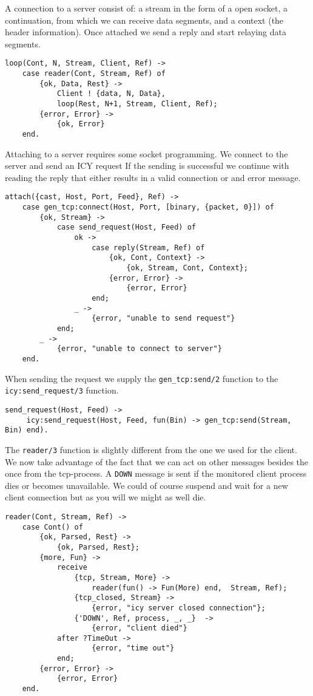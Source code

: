 \documentclass[a4paper,11pt]{article}
\begin{document}
A connection to a server consist of: a stream in the form of a open
socket, a continuation, from which we can receive data segments, and a
context (the header information). Once attached we send a reply and
start relaying data segments.

\begin{verbatim}
loop(Cont, N, Stream, Client, Ref) ->
    case reader(Cont, Stream, Ref) of
        {ok, Data, Rest} ->
            Client ! {data, N, Data},
            loop(Rest, N+1, Stream, Client, Ref);
        {error, Error} ->
            {ok, Error}
    end.
\end{verbatim}

Attaching to a server requires some socket programming. We connect to
the server and send an ICY request If the sending is successful we continue with reading the
reply that either results in a valid connection or and error message.


\begin{verbatim}
attach({cast, Host, Port, Feed}, Ref) ->
    case gen_tcp:connect(Host, Port, [binary, {packet, 0}]) of
        {ok, Stream} ->
            case send_request(Host, Feed) of
                ok ->
                    case reply(Stream, Ref) of
                        {ok, Cont, Context} ->
                            {ok, Stream, Cont, Context};
                        {error, Error} ->
                            {error, Error}
                    end;
                _ ->
                    {error, "unable to send request"}
            end;
        _ ->
            {error, "unable to connect to server"}
    end.
\end{verbatim}

When sending the request we supply the {\tt gen\_tcp:send/2} function
to the {\tt icy:send\_request/3} function.

\begin{verbatim}
send_request(Host, Feed) ->
     icy:send_request(Host, Feed, fun(Bin) -> gen_tcp:send(Stream, Bin) end).
\end{verbatim}

The {\tt reader/3} function is slightly different from the one we used
for the client. We now take advantage of the fact that we can act on
other messages besides the once from the tcp-process. A {\tt DOWN}
message is sent if the monitored client process dies or becomes
unavailable. We could of course suspend and wait for a new client
connection but as you will we might as well die.


\begin{verbatim}
reader(Cont, Stream, Ref) ->
    case Cont() of
        {ok, Parsed, Rest} ->
            {ok, Parsed, Rest};
        {more, Fun} ->
            receive
                {tcp, Stream, More} ->
                    reader(fun() -> Fun(More) end,  Stream, Ref);
                {tcp_closed, Stream} ->
                    {error, "icy server closed connection"};            
                {'DOWN', Ref, process, _, _}  ->
                    {error, "client died"}
            after ?TimeOut ->
                    {error, "time out"}
            end;
        {error, Error} ->
            {error, Error}
    end.
\end{verbatim}
\end{document}
